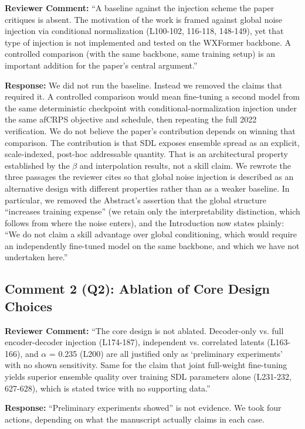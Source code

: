 \documentclass[12pt]{article}
\begin{document}
\textbf{Reviewer Comment:} ``A baseline against the injection scheme the paper
critiques is absent. The motivation of the work is framed against global noise
injection via conditional normalization (L100-102, 116-118, 148-149), yet that type of
injection is not implemented and tested on the WXFormer backbone. A controlled
comparison (with the same backbone, same training setup) is an important addition for
the paper's central argument.''

\textbf{Response:} We did not run the baseline. Instead we removed the claims that
required it. A controlled comparison would mean fine-tuning a second
model from the same deterministic checkpoint with conditional-normalization injection
under the same afCRPS objective and schedule, then repeating the full 2022
verification. We do not believe the paper's contribution depends on winning that
comparison. The contribution is that SDL exposes ensemble spread as an explicit,
scale-indexed, post-hoc addressable quantity. That is an architectural property
established by the $\beta$ and interpolation results, not a skill claim. We rewrote the
three passages the reviewer cites so that global noise injection is described as an
alternative design with different properties rather than as a weaker baseline. In
particular, we removed the Abstract's assertion that the global structure ``increases training
expense'' (we retain only the interpretability distinction, which
follows from where the noise enters), and the Introduction now states plainly: ``We do
not claim a skill advantage over global conditioning, which would require an
independently fine-tuned model on the same backbone, and which we have not undertaken
here.''

\subsection*{Comment 2 (Q2): Ablation of Core Design Choices}

\textbf{Reviewer Comment:} ``The core design is not ablated. Decoder-only vs. full
encoder-decoder injection (L174-187), independent vs. correlated latents (L163-166),
and $\alpha$ = 0.235 (L200) are all justified only as `preliminary experiments' with
no shown sensitivity. Same for the claim that joint full-weight fine-tuning yields
superior ensemble quality over training SDL parameters alone (L231-232, 627-628),
which is stated twice with no supporting data.''

\textbf{Response:} ``Preliminary experiments showed'' is not evidence. We took four
actions, depending on what the manuscript actually claims in each case.
\end{document}
